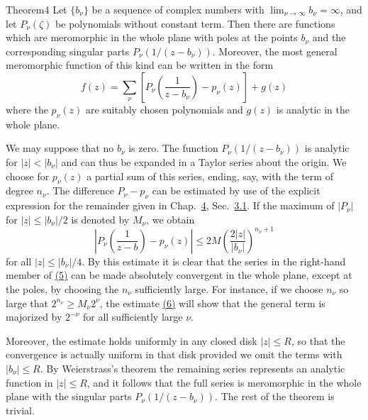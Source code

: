 \begin{originalstatement}{Theorem}{4}\label{thm:5.4}
Let $\{b_{\nu}\}$ be a sequence of complex numbers with $\lim_{\nu \to \infty} b_{\nu} = \infty$,
and let $P_{\nu}(\zeta)$ be polynomials without constant term. Then there are functions which are meromorphic in the whole plane with poles at the points $b_{\nu}$ and the corresponding singular parts $P_{\nu}(1/(z - b_{\nu}))$. Moreover, the most general meromorphic function of this kind can be written in the form
\begin{equation*}
f (z) = \sum_ {\nu} \left[ P _ {\nu} \left(\frac {1}{z - b _ {\nu}}\right) - p _ {\nu} (z) \right] + g (z)\tag{5}\label{eq:5.5}
\end{equation*}
where the $p_{\nu}(z)$ are suitably chosen polynomials and $g(z)$ is analytic in the whole plane.

\end{originalstatement}
We may suppose that no $b_{\nu}$ is zero. The function $P_{\nu}(1 / (z - b_{\nu}))$ is analytic for $|z| < |b_{\nu}|$ and can thus be expanded in a Taylor series about the origin. We choose for $p_{\nu}(z)$ a partial sum of this series, ending, say, with the term of degree $n_{\nu}$. The difference $P_{\nu} - p_{\nu}$ can be estimated by use of the explicit expression for the remainder given in Chap.~\hyperref[chap:4]{4}, Sec.~\hyperref[sec:4.3.1]{3.1}. If the maximum of $|P_{\nu}|$ for $|z| \leq |b_{\nu}| / 2$ is denoted by $M_{\nu}$, we obtain
\begin{equation*}
\left| P _ {\nu} \left(\frac {1}{z - b}\right) - p _ {\nu} (z) \right| \leq 2 M \left(\frac {2 | z |}{| b _ {\nu} |}\right) ^ {n _ {\nu} + 1}\tag{6}\label{eq:5.6}
\end{equation*}
for all $|z| \leq |b_{\nu}| / 4$. By this estimate it is clear that the series in the right-hand member of \hyperref[eq:5.5]{(5)} can be made absolutely convergent in the whole plane, except at the poles, by choosing the $n_{\nu}$ sufficiently large. For instance, if we choose $n_{\nu}$ so large that $2^{n_{\nu}} \geq M_{\nu}2^{\nu}$, the estimate \hyperref[eq:5.6]{(6)} will show that the general term is majorized by $2^{-\nu}$ for all sufficiently large $\nu$.

Moreover, the estimate holds uniformly in any closed disk $|z| \leq R$, so that the convergence is actually uniform in that disk provided we omit the terms with $|b_{\nu}| \leq R$. By Weierstrass's theorem the remaining series represents an analytic function in $|z| \leq R$, and it follows that the full series is meromorphic in the whole plane with the singular parts $P_{\nu}(1/(z - b_{\nu}))$. The rest of the theorem is trivial.

